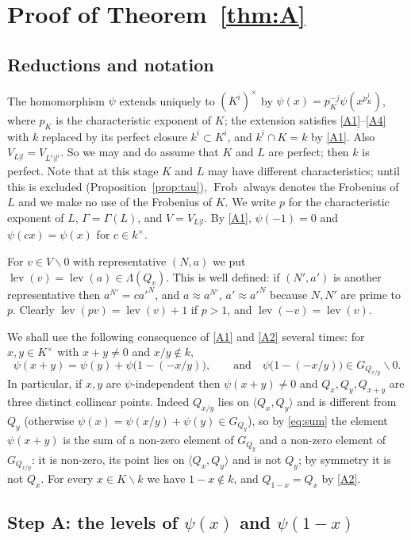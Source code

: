 \documentclass[11pt]{amsart}
\theoremstyle{definition}
\theoremstyle{remark}
\newcommand{\Frob}{\operatorname{Frob}}
\newcommand{\lev}{\operatorname{lev}}
\newcommand{\sm}{\smallsetminus}
\newcommand{\la}{\langle}
\newcommand{\ra}{\rangle}
\begin{document}
\section{Proof of Theorem~\ref{thm:A}}\label{sec:main}

\subsection{Reductions and notation}
The homomorphism $\psi$ extends uniquely to $(K^i)^\times$ by $\psi(x)=p_K^{-j}\psi(x^{p_K^j})$, where $p_K$ is the characteristic exponent of $K$; the extension satisfies \ref{A1}--\ref{A4} with $k$ replaced by its perfect closure $k^i\subset K^i$,
and $k^i\cap K=k$ by \ref{A1}. Also $V_{L|l}=V_{L^i|l^i}$. So we may and do assume that $K$ and $L$ are perfect; then $k$ is perfect.
Note that at this stage $K$ and $L$ may have different characteristics; until this is excluded (Proposition~\ref{prop:tau}), $\Frob$ always denotes the Frobenius of $L$ and we make no use of the Frobenius of $K$.
We write $p$ for the characteristic exponent of $L$, $\Gamma=\Gamma(L)$, and $V=V_{L|l}$. By \ref{A1}, $\psi(-1)=0$ and $\psi(cx)=\psi(x)$ for $c\in k^\times$.

For $v\in V\sm0$ with representative $(N,a)$ we put $\lev(v)=\lev(a)\in\Lambda(Q_v)$. This is well defined: if $(N',a')$ is another representative then $a^{N'}=ca'^N$, and $a\approx a^{N'}$, $a'\approx a'^N$ because $N,N'$ are prime to $p$.
Clearly $\lev(pv)=\lev(v)+1$ if $p>1$, and $\lev(-v)=\lev(v)$.

We shall use the following consequence of \ref{A1} and \ref{A2} several times: for $x,y\in K^\times$ with $x+y\neq0$ and $x/y\notin k$,
\begin{equation}\label{eq:sum}
\psi(x+y)=\psi(y)+\psi\bigl(1-(-x/y)\bigr),\qquad\text{and}\quad \psi\bigl(1-(-x/y)\bigr)\in G_{Q_{x/y}}\sm0 .
\end{equation}
In particular, if $x,y$ are $\psi$-independent then $\psi(x+y)\ne0$ and $Q_x,Q_y,Q_{x+y}$ are three distinct collinear points. Indeed $Q_{x/y}$ lies on $\la Q_x,Q_y\ra$ and is different from $Q_y$ (otherwise $\psi(x)=\psi(x/y)+\psi(y)\in G_{Q_y}$), so by \eqref{eq:sum} the element $\psi(x+y)$ is the sum of a non-zero element of $G_{Q_y}$ and a non-zero element of $G_{Q_{x/y}}$: it is non-zero, its point lies on $\la Q_x,Q_y\ra$ and is not $Q_y$; by symmetry it is not $Q_x$.
For every $x\in K\sm k$ we have $1-x\notin k$, and $Q_{1-x}=Q_x$ by \ref{A2}.

\subsection{Step A: the levels of \texorpdfstring{$\psi(x)$}{psi(x)} and \texorpdfstring{$\psi(1-x)$}{psi(1-x)}}\label{sec:stepA}
\end{document}
